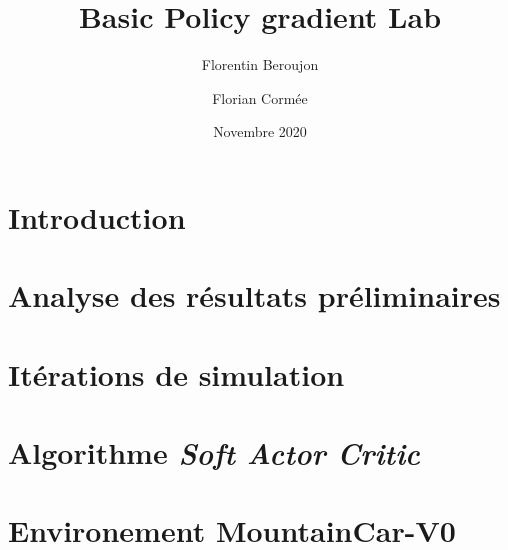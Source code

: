 \documentclass{article}
\title{Basic Policy gradient Lab}
\author{Florentin Beroujon \and Florian Cormée }
\date{Novembre 2020}
\begin{document}
\maketitle

\section{Introduction}

\section{Analyse des résultats préliminaires}


\section{Itérations de simulation}





\section{Algorithme \emph{Soft Actor Critic}}






\section{Environement MountainCar-V0}

\end{document}
